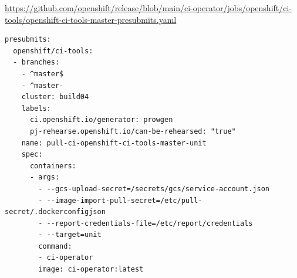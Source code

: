 \begin{frame}[fragile]
    \autotitle
    \scriptsize
    \url{https://github.com/openshift/release/blob/main/ci-operator/jobs/openshift/ci-tools/openshift-ci-tools-master-presubmits.yaml}
    \begin{verbatim}
presubmits:
  openshift/ci-tools:
  - branches:
    - ^master$
    - ^master-
    cluster: build04
    labels:
      ci.openshift.io/generator: prowgen
      pj-rehearse.openshift.io/can-be-rehearsed: "true"
    name: pull-ci-openshift-ci-tools-master-unit
    spec:
      containers:
      - args:
        - --gcs-upload-secret=/secrets/gcs/service-account.json
        - --image-import-pull-secret=/etc/pull-secret/.dockerconfigjson
        - --report-credentials-file=/etc/report/credentials
        - --target=unit
        command:
        - ci-operator
        image: ci-operator:latest
    \end{verbatim} %
\end{frame}

